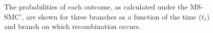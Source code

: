 \documentclass[11pt]{article}
\begin{document}
\begin{figure}
{		%
		The probabilities of each outcome, as calculated under the MS-SMC', 
		are shown for three branches as a function of the time ($t_r$) and branch 
		on which recombination occurs.
	}
	\label{fig:fig1}
\end{figure}
\end{document}
